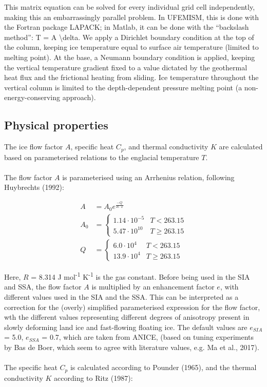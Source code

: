 \documentclass{article}
\begin{document}
This matrix equation can be solved for every individual grid cell independently, making this an embarrassingly parallel problem. In UFEMISM, this is done with the Fortran package LAPACK; in Matlab, it can be done with the “backslash method”: T = A \textbackslash delta. We apply a Dirichlet boundary condition at the top of the column, keeping ice temperature equal to surface air temperature (limited to melting point). At the base, a Neumann boundary condition is applied, keeping the vertical temperature gradient fixed to a value dictated by the geothermal heat flux and the frictional heating from sliding. Ice temperature throughout the vertical column is limited to the depth-dependent pressure melting point (a non-energy-conserving approach).

\subsection{Physical properties}

The ice flow factor $A$, specific heat $C_p$, and thermal conductivity $K$ are calculated based on parameterised relations to the englacial temperature $T$.\\
\\
The flow factor $A$ is parameterised using an Arrhenius relation, following Huybrechts (1992):

\begin{align}
A &= A_0 e^{\frac{-Q}{R \cdot T}} \\
A_0 &=\begin{cases}
  1.14 \cdot 10^{-5} & T < 263.15 \\
  5.47 \cdot 10^{10} & T \geq 263.15
       \end{cases} \\
Q &=\begin{cases}
  6.0 \cdot 10^4 & T < 263.15 \\
  13.9 \cdot 10^4 & T \geq 263.15
       \end{cases} 
\end{align}

Here, $R$ = 8.314 J mol\textsuperscript{-1} K\textsuperscript{-1} is the gas constant. Before being used in the SIA and SSA, the flow factor $A$ is multiplied by an enhancement factor $e$, with different values used in the SIA and the SSA. This can be interpreted as a correction for the (overly) simplified parameterised expression for the flow factor, wth the different values representing different degrees of anisotropy present in slowly deforming land ice and fast-flowing floating ice. The default values are $e_{SIA}$ = 5.0, $e_{SSA}$ = 0.7, which are taken from ANICE, (based on tuning experiments by Bas de Boer, which seem to agree with literature values, e.g. Ma et al., 2017). \\
\\
The specific heat $C_p$ is calculated according to Pounder (1965), and the thermal conductivity $K$ according to Ritz (1987):
\end{document}
